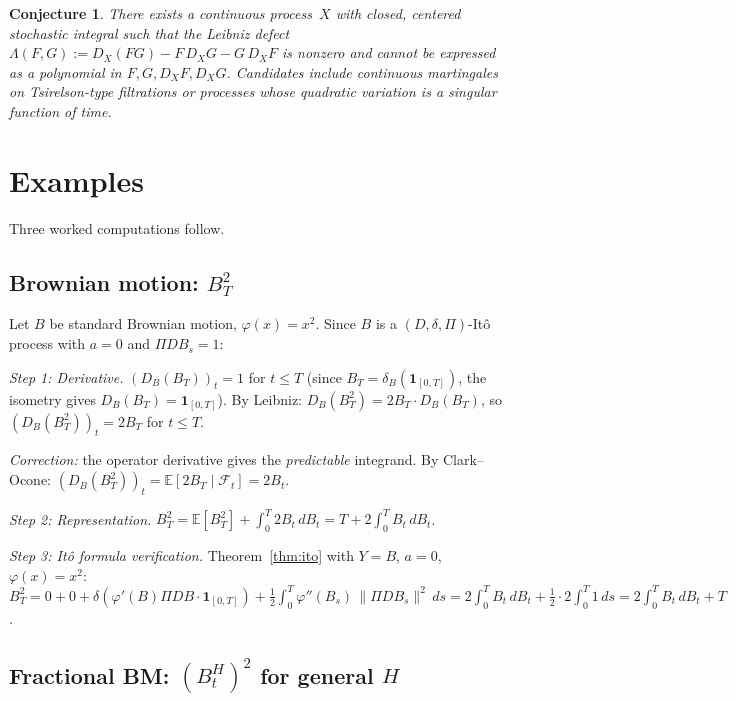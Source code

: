 \documentclass[11pt,a4paper]{article}
\theoremstyle{plain}
\newtheorem{conjecture}[theorem]{Conjecture}
\theoremstyle{definition}
\theoremstyle{remark}
\newcommand{\E}{\mathbb{E}}
\begin{document}
\begin{conjecture}\label{conj:wild}
There exists a continuous process~$X$ with closed, centered stochastic integral such that the Leibniz defect $\Lambda(F,G) := D_X(FG) - F\,D_X G - G\,D_X F$ is nonzero and cannot be expressed as a polynomial in $F, G, D_X F, D_X G$. Candidates include continuous martingales on Tsirelson-type filtrations or processes whose quadratic variation is a singular function of time.
\end{conjecture}


\section{Examples}\label{sec:ex}

Three worked computations follow.


\subsection{Brownian motion: $B_T^2$}

Let $B$ be standard Brownian motion, $\varphi(x) = x^2$. Since $B$ is a $(D,\delta,\Pi)$-It\^o process with $a = 0$ and $\Pi DB_s = 1$:

\emph{Step 1: Derivative.} $(D_B(B_T))_t = 1$ for $t \le T$ (since $B_T = \delta_B(\mathbf{1}_{[0,T]})$, the isometry gives $D_B(B_T) = \mathbf{1}_{[0,T]}$). By Leibniz: $D_B(B_T^2) = 2B_T \cdot D_B(B_T)$, so $(D_B(B_T^2))_t = 2B_T$ for $t \le T$.

\emph{Correction:} the operator derivative gives the \emph{predictable} integrand. By Clark--Ocone: $(D_B(B_T^2))_t = \E[2B_T \mid \mathcal{F}_t] = 2B_t$.

\emph{Step 2: Representation.} $B_T^2 = \E[B_T^2] + \int_0^T 2B_t\,dB_t = T + 2\int_0^T B_t\,dB_t$.

\emph{Step 3: It\^o formula verification.} Theorem~\ref{thm:ito} with $Y = B$, $a = 0$, $\varphi(x) = x^2$: $B_T^2 = 0 + 0 + \delta(\varphi'(B)\Pi DB\cdot\mathbf{1}_{[0,T]}) + \frac{1}{2}\int_0^T \varphi''(B_s)\,\|\Pi DB_s\|^2\,ds = 2\int_0^T B_t\,dB_t + \frac{1}{2}\cdot 2\int_0^T 1\,ds = 2\int_0^T B_t\,dB_t + T$. \checkmark



\subsection{Fractional BM: $(B^H_t)^2$ for general $H$}\label{ssec:ex_fbm}
\end{document}
